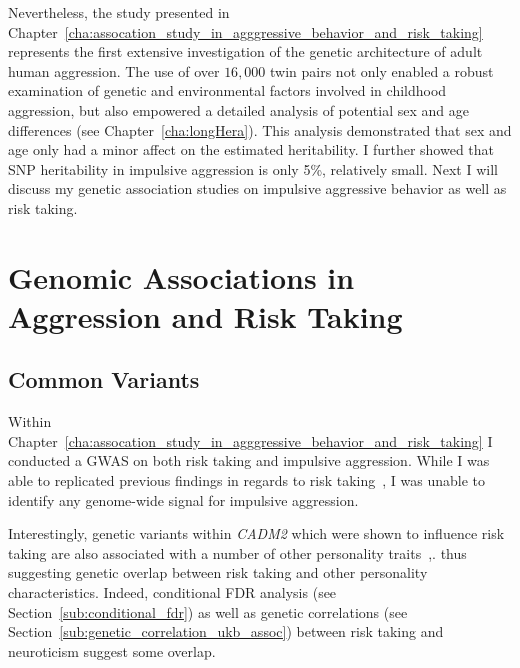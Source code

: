 Nevertheless, the study presented in Chapter~\ref{cha:assocation_study_in_agggressive_behavior_and_risk_taking} represents the first extensive investigation of the genetic architecture of adult human aggression.
The use of over $16,000$ twin pairs not only enabled a robust examination of genetic and environmental factors involved in childhood aggression, but also empowered a detailed analysis of potential sex and age differences (see Chapter~\ref{cha:longHera}).
This analysis demonstrated that sex and age only had a minor affect on the estimated heritability.
I further showed that SNP heritability in impulsive aggression is  only 5\%, relatively small.
Next I will discuss my genetic association studies on impulsive aggressive behavior as well as risk taking. 

\section{Genomic Associations in Aggression and Risk Taking}
\label{sec:genomic_associations_in_aggression_and_risk_taking}

\subsection{Common Variants}
\label{sub:common_variants_discussion}

Within Chapter~\ref{cha:assocation_study_in_agggressive_behavior_and_risk_taking} I conducted a GWAS on both risk taking and impulsive aggression.
While I was able to replicated previous findings in regards to risk taking~\cite{Day2016}, I was unable to identify any genome-wide signal for impulsive aggression.

Interestingly, genetic variants within \textit{CADM2} which were shown to influence risk taking are also associated with a number of other personality traits~\cite{Boutwell2017},.
thus suggesting genetic overlap between risk taking and other personality characteristics.
Indeed, conditional FDR analysis (see Section~\ref{sub:conditional_fdr}) as well as genetic correlations (see Section~\ref{sub:genetic_correlation_ukb_assoc}) between risk taking and neuroticism suggest some overlap.

